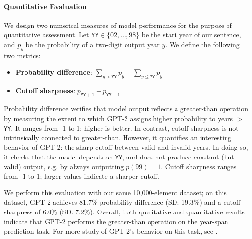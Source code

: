 \documentclass{article}
\newcommand{\YY}{\texttt{YY}}
\begin{document}
    \paragraph{Quantitative Evaluation} We design two numerical measures of model performance for the purpose of quantitative assessment. Let $\mathtt{YY}\in \{02, \ldots, 98\}$ be the start year of our sentence, and $p_y$  be the probability of a two-digit output year $y$. We define the following two metrics:
    \begin{itemize}
        \item \textbf{Probability difference}: $\sum_{y>\mathtt{YY}} p_{y} - \sum_{y \leq \mathtt{YY}} p_{y}$
        \item \textbf{Cutoff sharpness}: $p_{\mathtt{YY}+1} - p_{\mathtt{YY}-1}$
    \end{itemize}
  
	Probability difference verifies that model output reflects a greater-than operation by measuring the extent to which GPT-2 assigns higher probability to years $>$\YY. It ranges from -1 to 1; higher is better. In contrast, cutoff sharpness is not intrinsically connected to greater-than. However, it quantifies an interesting behavior of GPT-2: the sharp cutoff between valid and invalid years. In doing so, it checks that the model depends on \YY, and does not produce constant (but valid) output, e.g. by always outputting $p(99)=1$. Cutoff sharpness ranges from -1 to 1; larger values indicate a sharper cutoff.
 
    We perform this evaluation with our same 10,000-element dataset; on this dataset, GPT-2 achieves 81.7\% probability difference (SD: 19.3\%) and a cutoff sharpness of 6.0\% (SD: 7.2\%). Overall, both qualitative and quantitative results indicate that GPT-2 performs the greater-than operation on the year-span prediction task. For more study of GPT-2's behavior on this task, see .
\end{document}
